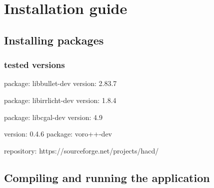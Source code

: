 \chapter*{Installation guide}

\section*{Installing packages}

\subsection*{tested versions}
package: libbullet-dev
 version: 2.83.7

 package: libirrlicht-dev
 version: 1.8.4

package: libcgal-dev
 version: 4.9

 version: 0.4.6
 package: voro++-dev
 
 repository: https://sourceforge.net/projects/hacd/

\section*{Compiling and running the application}